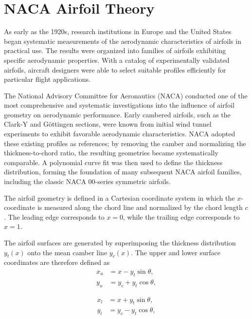 \section*{NACA Airfoil Theory}

As early as the 1920s, 
research institutions in Europe and the United States began systematic measurements of the aerodynamic characteristics of airfoils in practical use. 
The results were organized into families of airfoils exhibiting specific aerodynamic properties. 
With a catalog of experimentally validated airfoils, 
aircraft designers were able to select suitable profiles efficiently for particular flight applications.

The National Advisory Committee for Aeronautics (NACA) conducted one of the most comprehensive and systematic investigations into the influence of airfoil geometry on aerodynamic performance. 
Early cambered airfoils, 
such as the Clark-Y and Göttingen sections, 
were known from initial wind tunnel experiments to exhibit favorable aerodynamic characteristics. 
NACA adopted these existing profiles as references; 
by removing the camber and normalizing the thickness-to-chord ratio, the resulting geometries became systematically comparable. 
A polynomial curve fit was then used to define the thickness distribution, forming the foundation of many subsequent NACA airfoil families, including the classic NACA 00-series symmetric airfoils.

The airfoil geometry is defined in a Cartesian coordinate system in which the $x$-coordinate is measured along the chord line and normalized by the chord length $c$. 
The leading edge corresponds to $x = 0$, while the trailing edge corresponds to $x = 1$.

The airfoil surfaces are generated by superimposing the thickness distribution $y_t(x)$ onto the mean camber line $y_c(x)$. 
The upper and lower surface coordinates are therefore defined as
\begin{equation}
\begin{aligned}
x_u &= x - y_t \sin \theta, \\
y_u &= y_c + y_t \cos \theta,
\end{aligned}
\label{upper_camber}
\end{equation}

\begin{equation}
\begin{aligned}
x_l &= x + y_t \sin \theta, \\
y_l &= y_c - y_t \cos \theta,
\end{aligned}
\label{lower_camber}
\end{equation}

